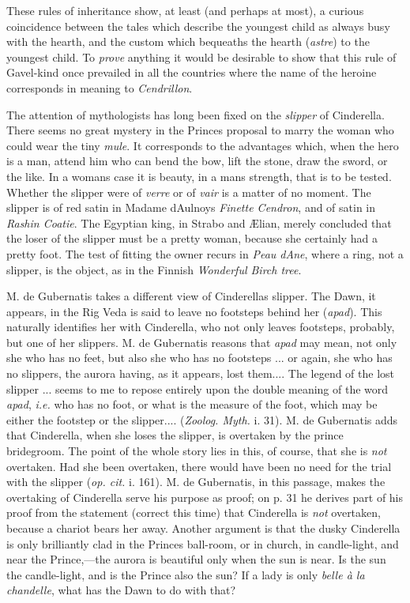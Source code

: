 \documentclass[14pt,a4paper]{memoir}
\begin{document}
{These rules of inheritance show, at least (and perhaps at most), a
curious coincidence between the tales which describe the youngest child
as always busy with the hearth, and the custom which bequeaths the
hearth (\emph{astre}) to the youngest child. To \emph{prove} anything it
would be desirable to show that this rule of Gavel-kind once prevailed
in all the countries where the name of the heroine corresponds in
meaning to \emph{Cendrillon}.

The attention of mythologists has long been fixed on the \emph{slipper}
of Cinderella. There seems no great mystery in the
Prince\textquotesingle s proposal to marry the woman who could wear the
tiny \emph{mule}. It corresponds to the advantages which, when the hero
is a man, attend him who can bend the bow, lift the stone, draw the
sword, or the like. In a woman\textquotesingle s case it is beauty, in a
man\textquotesingle s strength, that is to be tested. Whether the
slipper were of \emph{verre} or of \emph{vair} is a matter of no moment.
The slipper is of red satin in Madame
d\textquotesingle Aulnoy\textquotesingle s \emph{Finette Cendron}, and
of satin in \emph{Rashin Coatie}. The Egyptian king, in Strabo and
Ælian, merely concluded that the loser of the slipper must be a pretty
woman, because she certainly had a pretty foot. The test of fitting the
owner recurs in \emph{Peau d\textquotesingle Ane}, where a ring, not a
slipper, is the object, as in the Finnish \emph{Wonderful Birch tree}.

M. de Gubernatis takes a different view of Cinderella\textquotesingle s
slipper. The Dawn, it appears, in the Rig Veda is said to leave no
footsteps behind her (\emph{apad}). This naturally identifies her with
Cinderella, who not only leaves footsteps, probably, but one of her
slippers. M. de Gubernatis reasons that \emph{apad} \textquotesingle may
mean, not only she who has no feet, but also she who has no footsteps
... or again, she who has no slippers, the aurora having, as it appears,
lost them.... The legend of the lost slipper ... seems to me to repose
entirely upon the double meaning of the word \emph{apad}, \emph{i.e.}
who has no foot, or what is the measure of the foot, which may be either
the footstep or the slipper....\textquotesingle{} (\emph{Zoolog. Myth.}
i. 31). M. de Gubernatis adds that \textquotesingle Cinderella, when she
loses the slipper, is overtaken by the prince
bridegroom.\textquotesingle{} The point of the whole story lies in this,
of course, that she is \emph{not} overtaken. Had she been overtaken,
there would have been no need for the trial with the slipper (\emph{op.
cit.} i. 161). M. de Gubernatis, in this passage, makes the overtaking
of Cinderella serve his purpose as proof; on p. 31 he derives part of
his proof from the statement (correct this time) that Cinderella is
\emph{not} overtaken, \textquotesingle because a chariot bears her
away.\textquotesingle{} Another argument is that the dusky Cinderella is
only brilliantly clad \textquotesingle in the Prince\textquotesingle s
ball-room, or in church, in candle-light, and near the Prince,---the
aurora is beautiful only when the sun is near.\textquotesingle{} Is the
sun the candle-light, and is the Prince also the sun? If a lady is only
\emph{belle à la chandelle}, what has the Dawn to do with that?

}
\end{document}
